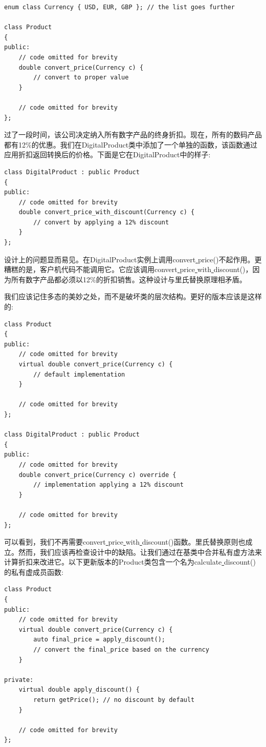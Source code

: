 \begin{lstlisting}[caption={}]
enum class Currency { USD, EUR, GBP }; // the list goes further

class Product
{
public:
	// code omitted for brevity
	double convert_price(Currency c) {
		// convert to proper value
	}

	// code omitted for brevity
};
\end{lstlisting}

过了一段时间，该公司决定纳入所有数字产品的终身折扣。现在，所有的数码产品都有12\%的优惠。我们在DigitalProduct类中添加了一个单独的函数，该函数通过应用折扣返回转换后的价格。下面是它在DigitalProduct中的样子: \par

\begin{lstlisting}[caption={}]
class DigitalProduct : public Product
{
public:
	// code omitted for brevity
	double convert_price_with_discount(Currency c) {
		// convert by applying a 12% discount
	}
};
\end{lstlisting}

设计上的问题显而易见。在DigitalProduct实例上调用convert\underline{ }price()不起作用。更糟糕的是，客户机代码不能调用它。它应该调用convert\underline{ }price\underline{ }with\underline{ }discount()，因为所有数字产品都必须以12\%的折扣销售。这种设计与里氏替换原理相矛盾。 \par
我们应该记住多态的美妙之处，而不是破坏类的层次结构。更好的版本应该是这样的: \par

\begin{lstlisting}[caption={}]
class Product
{
public:
	// code omitted for brevity
	virtual double convert_price(Currency c) {
		// default implementation
	}

	// code omitted for brevity
};

class DigitalProduct : public Product
{
public:
	// code omitted for brevity
	double convert_price(Currency c) override {
		// implementation applying a 12% discount
	}

	// code omitted for brevity
};
\end{lstlisting}

可以看到，我们不再需要convert\underline{ }price\underline{ }with\underline{ }discount()函数。里氏替换原则也成立。然而，我们应该再检查设计中的缺陷。让我们通过在基类中合并私有虚方法来计算折扣来改进它。以下更新版本的Product类包含一个名为calculate\underline{ }discount()的私有虚成员函数: \par

\begin{lstlisting}[caption={}]
class Product
{
public:
	// code omitted for brevity
	virtual double convert_price(Currency c) {
		auto final_price = apply_discount();
		// convert the final_price based on the currency
	}

private:
	virtual double apply_discount() {
		return getPrice(); // no discount by default
	}

	// code omitted for brevity
};
\end{lstlisting}

